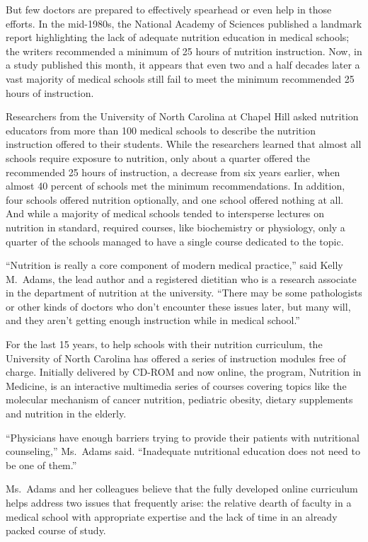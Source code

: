 ﻿\documentclass[12pt]{article}
\begin{document}
But few doctors are prepared to effectively spearhead or even help in those efforts. In the
mid-1980s, the National Academy of Sciences published a landmark report highlighting the lack of
adequate nutrition education in medical schools; the writers recommended a minimum of 25 hours of
nutrition instruction. Now, in a study published this month, it appears that even two and a half
decades later a vast majority of medical schools still fail to meet the minimum recommended 25 hours
of instruction.

Researchers from the University of North Carolina at Chapel Hill asked nutrition educators from more
than 100 medical schools to describe the nutrition instruction offered to their students. While the
researchers learned that almost all schools require exposure to nutrition, only about a quarter
offered the recommended 25 hours of instruction, a decrease from six years earlier, when almost 40
percent of schools met the minimum recommendations. In addition, four schools offered nutrition
optionally, and one school offered nothing at all. And while a majority of medical schools tended to
intersperse lectures on nutrition in standard, required courses, like biochemistry or physiology,
only a quarter of the schools managed to have a single course dedicated to the topic.

``Nutrition is really a core component of modern medical practice,'' said Kelly M.~Adams, the lead
author and a registered dietitian who is a research associate in the department of nutrition at the
university. ``There may be some pathologists or other kinds of doctors who don't encounter these
issues later, but many will, and they aren't getting enough instruction while in medical school.''

For the last 15 years, to help schools with their nutrition curriculum, the University of North
Carolina has offered a series of instruction modules free of charge. Initially delivered by CD-ROM
and now online, the program, Nutrition in Medicine, is an interactive multimedia series of courses
covering topics like the molecular mechanism of cancer nutrition, pediatric obesity, dietary
supplements and nutrition in the elderly.

``Physicians have enough barriers trying to provide their patients with nutritional counseling,''
Ms.~Adams said. ``Inadequate nutritional education does not need to be one of them.''

Ms.~Adams and her colleagues believe that the fully developed online curriculum helps address two
issues that frequently arise: the relative dearth of faculty in a medical school with appropriate
expertise and the lack of time in an already packed course of study.
\end{document}
